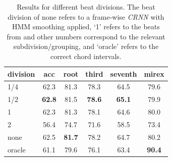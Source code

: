 \begin{table}[h]
    \centering
    \begin{tabular}{lccccc}
        \toprule
        division & acc & root & third & seventh & mirex \\  
        \midrule
        1/4                 & 62.3           & 81.3          & 78.3          & 64.5           & 79.6         \\
        1/2                 & \textbf{62.8}  & 81.5          & \textbf{78.6} & \textbf{65.1}  & 79.9         \\
        1                   & 62.3           & 81.3          & 78.1          & 64.6           & 80.0         \\
        2                   & 56.4           & 74.7          & 71.6          & 58.5           & 73.4         \\
        none                & 62.5           & \textbf{81.7} & 78.2          & 64.7           & 80.2         \\
        oracle             & 61.1           & 79.6          & 76.1          & 63.4           & \textbf{90.4}\\
        \bottomrule
    \end{tabular}
    \caption{Results for different beat divisions. The beat division of none refers to a frame-wise \emph{CRNN} with HMM smoothing applied, `1' refers to the beats from  and other numbers correspond to the relevant subdivision/grouping, and `oracle' refers to the correct chord intervals. 
    }\label{tab:beat_division}
\end{table}

